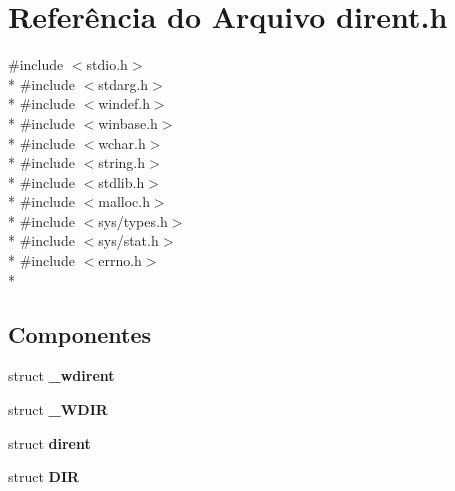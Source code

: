 \section{Referência do Arquivo dirent.\+h}
\label{dirent_8h}
{\ttfamily \#include $<$stdio.\+h$>$}\\*
{\ttfamily \#include $<$stdarg.\+h$>$}\\*
{\ttfamily \#include $<$windef.\+h$>$}\\*
{\ttfamily \#include $<$winbase.\+h$>$}\\*
{\ttfamily \#include $<$wchar.\+h$>$}\\*
{\ttfamily \#include $<$string.\+h$>$}\\*
{\ttfamily \#include $<$stdlib.\+h$>$}\\*
{\ttfamily \#include $<$malloc.\+h$>$}\\*
{\ttfamily \#include $<$sys/types.\+h$>$}\\*
{\ttfamily \#include $<$sys/stat.\+h$>$}\\*
{\ttfamily \#include $<$errno.\+h$>$}\\*
\subsection*{Componentes}
\begin{DoxyCompactItemize}
\item 
struct {\bf \+\_\+wdirent}
\item 
struct {\bf \+\_\+\+W\+D\+IR}
\item 
struct {\bf dirent}
\item 
struct {\bf D\+IR}
\end{DoxyCompactItemize}
